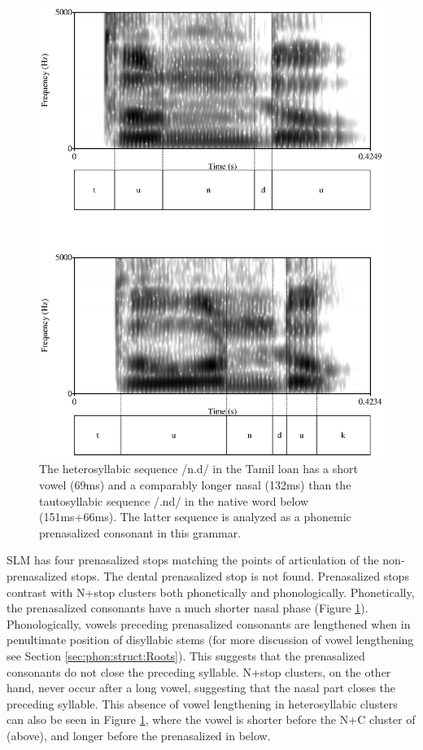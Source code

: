 \begin{figure}
 \centering 
\includegraphics[width=.8\textwidth]{pics/thunduthuunduk.eps}
\caption[Spectrogram of tautosyllabic and heterosyllabic NC-clusters]{The heterosyllabic sequence /n.d/ in the Tamil loan  has a short vowel (69ms) and a comparably longer nasal (132ms) than the tautosyllabic sequence /.nd/ in the native word  below (151ms+66ms). The latter sequence is analyzed as a phonemic prenasalized consonant in this grammar.}
\label{fig:thunduthuunduk}
\end{figure}

SLM has four prenasalized stops matching the points of articulation of the non-prenasalized stops. The dental prenasalized stop is not found. Prenasalized stops contrast with N+stop clusters both phonetically and phonologically. Phonetically, the prenasalized consonants have a much shorter nasal phase (Figure \ref{fig:thunduthuunduk}). Phonologically, vowels preceding prenasalized consonants are lengthened when in penultimate position of disyllabic stems (for more discussion of vowel lengthening see Section \ref{sec:phon:struct:Roots}). This suggests that the prenasalized consonants do not close the preceding syllable. N+stop clusters, on the other hand, never occur after a long vowel, suggesting that the nasal part closes the preceding syllable. This absence of vowel lengthening in heterosyllabic clusters can also be seen  in Figure \ref{fig:thunduthuunduk}, where the vowel is shorter before the N+C cluster of  (above), and longer before the prenasalized \nd{} in  below.

